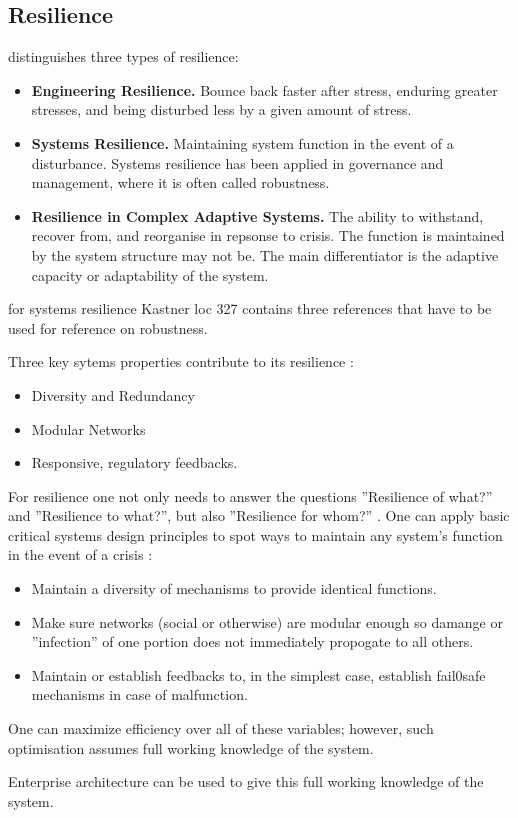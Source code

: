 \subsection{Resilience}
\textcite[p. 5-7]{MartinBreen2011} distinguishes three types of resilience:
\begin{itemize}
	\item{\textbf{Engineering Resilience.} Bounce back faster after stress, enduring greater stresses, and being disturbed less by a given amount of stress.}
	\item{\textbf{Systems Resilience.} Maintaining system function in the event of a disturbance. Systems resilience has been applied in governance and management, where it is often called robustness.}
	\item{\textbf{Resilience in Complex Adaptive Systems.} The ability to withstand, recover from, and reorganise in repsonse to crisis. The function is maintained by the system structure may not be. The main differentiator is the adaptive capacity or adaptability of the system.}
\end{itemize}
\begin{remark}
for systems resilience Kastner loc 327 contains three references that have to be used for reference on robustness.
\end{remark}
Three key sytems properties contribute to its resilience \parencite[p. 9]{MartinBreen2011}:
\begin{itemize}
	\item{Diversity and Redundancy}
	\item{Modular Networks}
	\item{Responsive, regulatory feedbacks.}
\end{itemize}
For resilience one not only needs to answer the questions ''Resilience of what?'' and ''Resilience to what?'', but also ''Resilience for whom?'' \parencite[p. 21]{Lebel2006}. One can apply basic critical systems design principles to spot ways to maintain any system's function in the event of a crisis \parencite[p. 10]{MartinBreen2011}:
\begin{itemize}
	\item{Maintain a diversity of mechanisms to provide identical functions.}
	\item{Make sure networks (social or otherwise) are modular enough so damange or ''infection'' of one portion does not immediately propogate to all others.}
	\item{Maintain or establish feedbacks to, in the simplest case, establish fail0safe mechanisms in case of malfunction.}
\end{itemize}
One can maximize efficiency over all of these variables; however, such optimisation assumes full working knowledge of the system.
\begin{remark}
Enterprise architecture can be used to give this full working knowledge of the system.
\end{remark}

